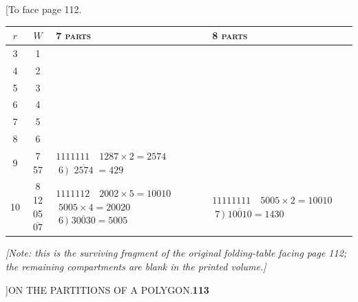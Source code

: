 \documentclass[11pt]{article}
\begin{document}
\newpage
\noindent\hfill [To face page 112.

\smallskip
\begin{center}
\renewcommand{\arraystretch}{1.15}
\setlength{\tabcolsep}{6pt}
\footnotesize
\begin{tabular}{|c|c|l|l|}
\hline
$r$ & $W$ & \hfil 7 \textsc{parts}\hfil & \hfil 8 \textsc{parts}\hfil \\
\hline
3  & 1 & & \\
\hline
4  & 2 & & \\
\hline
5  & 3 & & \\
\hline
6  & 4 & & \\
\hline
7  & 5 & & \\
\hline
8  & 6 & & \\
\hline
9  & 7 \makecell[c]{\\57} &
\makecell[l]{$1111111\quad 1287\times 2=2574$\\
\phantom{$1111111\quad\,$}$\;6\,)\;\overline{\;2574\;}=429$} & \\
\hline
10 & \makecell[c]{8\\12\\\\05\\$\overline{07}$} &
\makecell[l]{$1111112\quad 2002\times 5 = 10010$\\
\phantom{$1111112\quad\,$}$\;5005\times 4=20020$\\
\phantom{$1111112\quad\,$}$\;6\,)\;\overline{30030}=5005$} &
\makecell[l]{$11111111\quad 5005\times 2 = 10010$\\
\phantom{$11111111\quad\,$}$\;7\,)\;\overline{10010}=1430$} \\
\hline
\end{tabular}
\end{center}

\medskip
\noindent\emph{[Note: this is the surviving fragment of the original
folding-table facing page 112; the remaining compartments are blank in the
printed volume.]}

\newpage
{}]\hfill ON THE PARTITIONS OF A POLYGON.\hfill\textbf{113}
\end{document}
